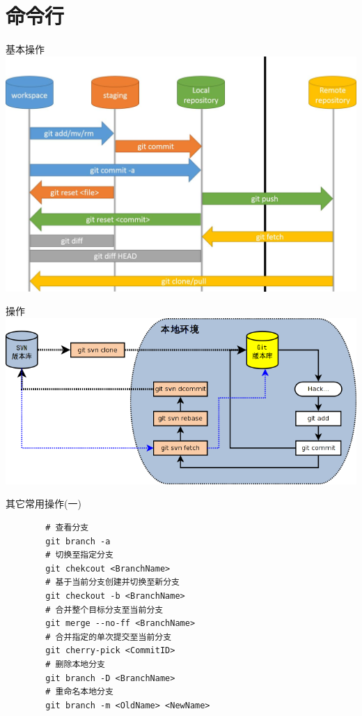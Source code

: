 \section{命令行}

\begin{frame}[t]{基本操作}
    \centering
    \includegraphics[scale=0.38]{figures/git-basic.jpg}
\end{frame}

\begin{frame}{操作}
    \centering
    \includegraphics[scale=0.42]{figures/git-svn-basic.jpg}
\end{frame}

\begin{frame}[fragile]{其它常用操作(一)}
    \begin{lstlisting}
        # 查看分支
        git branch -a
        # 切换至指定分支
        git chekcout <BranchName>
        # 基于当前分支创建并切换至新分支
        git checkout -b <BranchName>
        # 合并整个目标分支至当前分支
        git merge --no-ff <BranchName>
        # 合并指定的单次提交至当前分支
        git cherry-pick <CommitID>
        # 删除本地分支
        git branch -D <BranchName>
        # 重命名本地分支
        git branch -m <OldName> <NewName>
    \end{lstlisting}
\end{frame}


